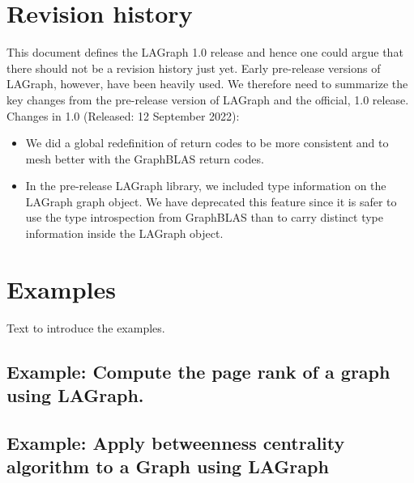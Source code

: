 \chapter{Revision history}
\label{Chp:RevHistory}

This document defines the LAGraph 1.0 release and hence one could argue that there should not be a
revision history just yet.    Early pre-release versions of LAGraph, however, have been heavily used.  
We therefore need to summarize the key changes from the pre-release version of LAGraph and 
the official, 1.0 release.  
Changes in 1.0 (Released: 12 September 2022):
\begin{itemize}
\item We did a global redefinition of return codes to be more consistent and to mesh better with the GraphBLAS
return codes.
\item In the pre-release LAGraph library, we included type information on the LAGraph graph object.  We have
deprecated this feature since it is safer to use the type introspection from GraphBLAS than to carry distinct type
information inside the LAGraph  object.
\end{itemize}



\chapter{Examples}
\label{Chp:Examples}

Text to introduce the examples.

\pagebreak
\nolinenumbers
\section{Example: Compute the page rank of a graph using LAGraph.}
{\scriptsize

}
\vfill

\pagebreak
\nolinenumbers
\section{Example: Apply betweenness centrality algorithm to a Graph using LAGraph}
{\scriptsize

}
\vfill

\linenumbers
